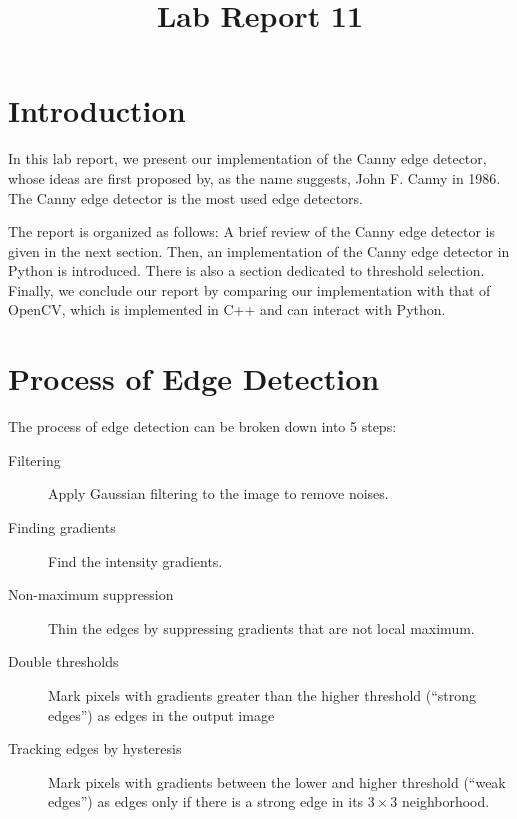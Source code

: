 \documentclass{ee208report}
\title{Lab Report 11}
\begin{document}
\begin{CJK}{UTF8}{gbsn}
    \maketitle
\end{CJK}

\begin{multicols*}{2}

\section{Introduction}

In this lab report, we present our implementation of the Canny edge detector,
whose ideas are first proposed by, as the name suggests, John F. Canny in 1986.
The Canny edge detector is the most used edge detectors.

The report is organized as follows: A brief review of the Canny edge detector is
given in the next section. Then, an implementation of the Canny edge detector in
Python is introduced. There is also a section dedicated to threshold selection.
Finally, we conclude our report by comparing our implementation with that of
OpenCV, which is implemented in C++ and can interact with Python.

\section{Process of Edge Detection}

The process of edge detection can be broken down into 5 steps:

\begin{description}
    \item[Filtering] Apply Gaussian filtering to the image to remove noises.
    \item[Finding gradients] Find the intensity gradients.
    \item[Non-maximum suppression] Thin the edges by suppressing gradients that
    are not local maximum.
    \item[Double thresholds] Mark pixels with gradients greater than the higher
    threshold (``strong edges'') as edges in the output image
    \item[Tracking edges by hysteresis] Mark pixels with gradients between the
    lower and higher threshold (``weak edges'') as edges only if there is a
    strong edge in its $3 \times 3$ neighborhood.
\end{description}


\end{multicols*}
\end{document}
